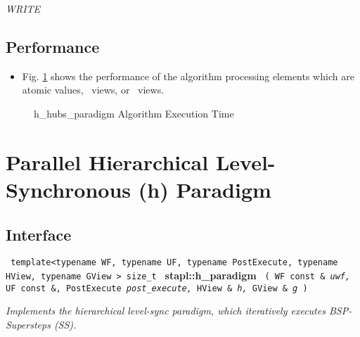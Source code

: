 \textit{WRITE}

\subsection{Performance} \label{sec-hubs-para-alg-perf}

\begin{itemize}
\item
Fig. \ref{fig:h-hubs-para-alg-exec-exper}
shows the performance of the algorithm processing
elements which are atomic values, \stl\ views, or \stapl\ views.
\end{itemize}

\begin{figure}[p]
\caption{ h\_hubs\_paradigm Algorithm Execution Time}
\label{fig:h-hubs-para-alg-exec-exper}
\end{figure}


\section {Parallel Hierarchical Level-Synchronous (h) Paradigm}
\label{sec-level-para-alg}

\subsection{Interface} \label{sec-level-para-alg-inter}

\noindent
\texttt{%
template<typename WF, typename UF, typename PostExecute, 
\newline
typename HView, typename GView >
\newline
size\_t 
}
\newline
\textbf{stapl::h\_paradigm}%
\newline
\texttt{%
(
WF const \&
\textit{uwf,}%
UF const \&,
PostExecute
\textit{post\_execute,}%
HView \&
\textit{h,}%
GView \&    
\textit{g}%
)     
}
\vspace{0.4cm}

\textit{
Implements the hierarchical level-sync paradigm, which iteratively executes BSP-Supersteps (SS). 
}
\vspace{0.4cm}

